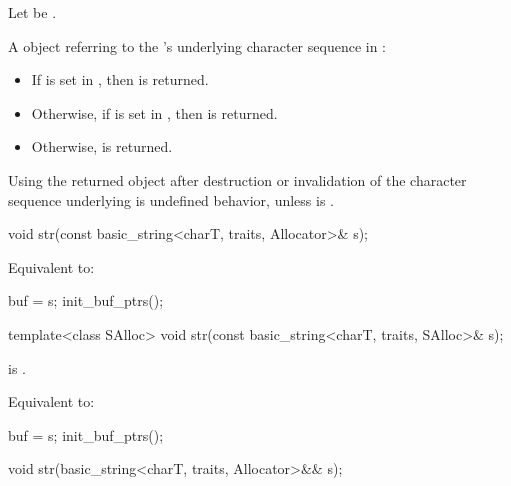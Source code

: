 \begin{itemdescr}
\pnum
Let  be .

\pnum
\returns
A  object referring to
the 's underlying character sequence in :
\begin{itemize}
\item If  is set in ,
  then  is returned.
\item Otherwise, if  is set in ,
  then  is returned.
\item Otherwise,  is returned.
\end{itemize}

\pnum
\begin{note}
Using the returned  object after
destruction or invalidation of the character sequence underlying 
is undefined behavior, unless  is .
\end{note}
\end{itemdescr}

%
\begin{itemdecl}
void str(const basic_string<charT, traits, Allocator>& s);
\end{itemdecl}

\begin{itemdescr}
\pnum
\effects
Equivalent to:
\begin{codeblock}
buf = s;
init_buf_ptrs();
\end{codeblock}
\end{itemdescr}

%
\begin{itemdecl}
template<class SAlloc>
  void str(const basic_string<charT, traits, SAlloc>& s);
\end{itemdecl}

\begin{itemdescr}
\pnum
\constraints
{} is .

\pnum
\effects
Equivalent to:
\begin{codeblock}
buf = s;
init_buf_ptrs();
\end{codeblock}
\end{itemdescr}

%
\begin{itemdecl}
void str(basic_string<charT, traits, Allocator>&& s);
\end{itemdecl}


